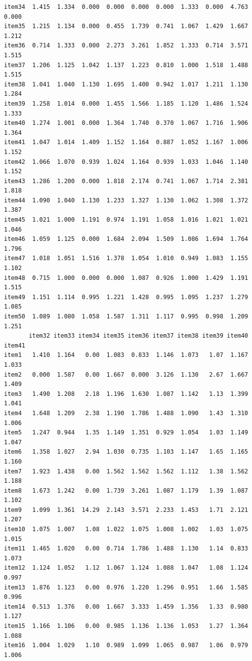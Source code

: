 \documentclass[
  a4paper,
]{ltjsbook}
\begin{document}
\begin{verbatim}
item34  1.415  1.334  0.000  0.000  0.000  0.000  1.333  0.000  4.763  0.000
item35  1.215  1.134  0.000  0.455  1.739  0.741  1.067  1.429  1.667  1.212
item36  0.714  1.333  0.000  2.273  3.261  1.852  1.333  0.714  3.571  1.515
item37  1.206  1.125  1.042  1.137  1.223  0.810  1.000  1.518  1.488  1.515
item38  1.041  1.040  1.130  1.695  1.400  0.942  1.017  1.211  1.130  1.284
item39  1.258  1.014  0.000  1.455  1.566  1.185  1.120  1.486  1.524  1.333
item40  1.274  1.001  0.000  1.364  1.740  0.370  1.067  1.716  1.906  1.364
item41  1.047  1.014  1.409  1.152  1.164  0.887  1.052  1.167  1.006  1.152
item42  1.066  1.070  0.939  1.024  1.164  0.939  1.033  1.046  1.140  1.152
item43  1.286  1.200  0.000  1.818  2.174  0.741  1.067  1.714  2.381  1.818
item44  1.090  1.040  1.130  1.233  1.327  1.130  1.062  1.308  1.372  1.387
item45  1.021  1.000  1.191  0.974  1.191  1.058  1.016  1.021  1.021  1.046
item46  1.059  1.125  0.000  1.684  2.094  1.509  1.086  1.694  1.764  1.796
item47  1.018  1.051  1.516  1.378  1.054  1.010  0.949  1.083  1.155  1.102
item48  0.715  1.000  0.000  0.000  1.087  0.926  1.000  1.429  1.191  1.515
item49  1.151  1.114  0.995  1.221  1.428  0.995  1.095  1.237  1.279  1.085
item50  1.089  1.080  1.058  1.587  1.311  1.117  0.995  0.998  1.209  1.251
       item32 item33 item34 item35 item36 item37 item38 item39 item40 item41
item1   1.410  1.164   0.00  1.083  0.833  1.146  1.073   1.07  1.167  1.033
item2   0.000  1.587   0.00  1.667  0.000  3.126  1.130   2.67  1.667  1.409
item3   1.490  1.208   2.18  1.196  1.630  1.087  1.142   1.13  1.399  1.041
item4   1.648  1.209   2.38  1.190  1.786  1.488  1.090   1.43  1.310  1.006
item5   1.247  0.944   1.35  1.149  1.351  0.929  1.054   1.03  1.149  1.047
item6   1.358  1.027   2.94  1.030  0.735  1.103  1.147   1.65  1.165  1.160
item7   1.923  1.438   0.00  1.562  1.562  1.562  1.112   1.38  1.562  1.188
item8   1.673  1.242   0.00  1.739  3.261  1.087  1.179   1.39  1.087  1.102
item9   1.099  1.361  14.29  2.143  3.571  2.233  1.453   1.71  2.121  1.207
item10  1.075  1.007   1.08  1.022  1.075  1.008  1.002   1.03  1.075  1.015
item11  1.465  1.020   0.00  0.714  1.786  1.488  1.130   1.14  0.833  1.073
item12  1.124  1.052   1.12  1.067  1.124  1.088  1.047   1.08  1.124  0.997
item13  1.876  1.123   0.00  0.976  1.220  1.296  0.951   1.66  1.585  0.996
item14  0.513  1.376   0.00  1.667  3.333  1.459  1.356   1.33  0.980  1.127
item15  1.166  1.106   0.00  0.985  1.136  1.136  1.053   1.27  1.364  1.088
item16  1.004  1.029   1.10  0.989  1.099  1.065  0.987   1.06  0.979  1.006

\end{verbatim}
\end{document}
